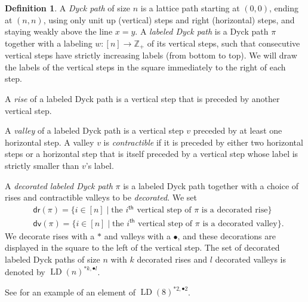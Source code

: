 \documentclass[reqno]{amsart}
\theoremstyle{plain}
\theoremstyle{definition}
\newtheorem{definition}[theorem]{Definition}
\theoremstyle{remark}
\renewcommand{\th}{^\mathsf{th}}
\DeclareMathOperator{\LD}{LD}
\newcommand{\<}{\langle}
\renewcommand{\>}{\rangle}
\begin{document}
\begin{definition}
    A \emph{Dyck path} of size $n$ is a lattice path starting at $(0,0)$, ending at $(n,n)$, using only unit up (vertical) steps and right (horizontal) steps, and staying weakly above the line $x=y$. A \emph{labeled Dyck path} is a Dyck path $\pi$ together with a labeling $w \colon [n] \to \mathbb{Z}_+$ of its vertical steps, such that consecutive vertical steps have strictly increasing labels (from bottom to top). We will draw the labels of the vertical steps in the square immediately to the right of each step.

    A \emph{rise} of a labeled Dyck path is a vertical step that is preceded by another vertical step.

    A \emph{valley} of a labeled Dyck path is a vertical step $v$ preceded by at least one horizontal step. A valley $v$ is \emph{contractible} if it is preceded by either two horizontal steps or a horizontal step that is itself preceded by a vertical step whose label is strictly smaller than $v$'s label.

    A \emph{decorated labeled Dyck path} $\pi$ is a labeled Dyck path together with a choice of rises and contractible valleys to be \emph{decorated}.
    We set
    \begin{align*}
         & \mathsf{dr}(\pi) = \{i \in [n] \mid \text{the $i\th$ vertical step of $\pi$ is a decorated rise}\}     \\
         & \mathsf{dv}(\pi) = \{i \in [n] \mid \text{the $i\th$ vertical step of $\pi$ is a decorated valley}\}.
    \end{align*}
    We decorate rises with a $\ast$ and valleys with a $\bullet$, and these decorations are displayed in the square to the left of the vertical step. The set of decorated labeled Dyck paths of size $n$ with $k$ decorated rises and $l$ decorated valleys is denoted by $\LD(n)^{\ast k, \bullet l}$.
\end{definition}

See  for an example of an element of $\LD(8)^{\ast 2, \bullet 2}$.
\end{document}
